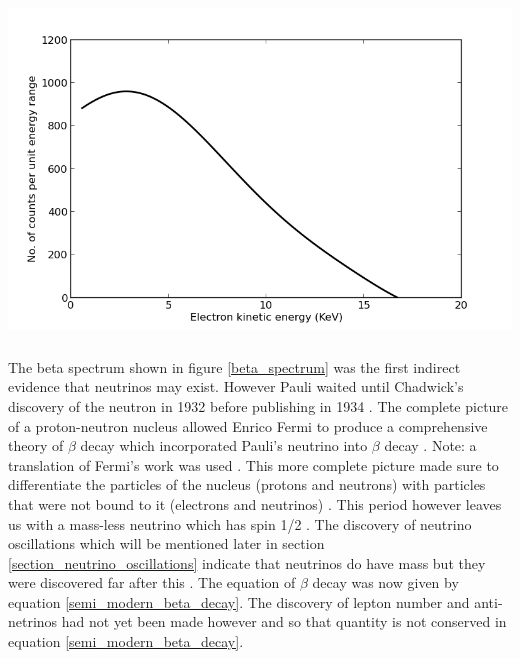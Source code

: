 \documentclass[12pt,a4paper]{article}
\newenvironment{Figure}
  {\par\medskip\noindent\minipage{\linewidth}}
  {\endminipage\par\medskip}
\begin{document}
\begin{Figure}
 \centering
 \includegraphics[height=90mm]{beta_spectrum.png}
 \label{beta_spectrum}
\end{Figure}

The beta spectrum shown in figure \ref{beta_spectrum} was the first indirect evidence that neutrinos may exist. However Pauli waited until Chadwick's discovery of the neutron in 1932 \cite{chadwick1932possible} before publishing in 1934 \cite{lederman1970resource}. The complete picture of a proton-neutron nucleus allowed Enrico Fermi to produce a comprehensive theory of $\beta$ decay which incorporated Pauli's neutrino into $\beta$ decay \cite{lederman1970resource} \cite{Fermi:1934hr}. Note: a translation of Fermi's work was used \cite{wilson1968fermi}. This more complete picture made sure to differentiate the particles of the nucleus (protons and neutrons) with particles that were not bound to it (electrons and neutrinos) \cite{Fermi:1934hr} \cite{wilson1968fermi}. This period however leaves us with a mass-less neutrino which has spin 1/2 \cite{lederman1970resource}. The discovery of neutrino oscillations which will be mentioned later in section \ref{section_neutrino_oscillations} indicate that neutrinos do have mass but they were discovered far after this \cite{griffiths2008introduction}. The equation of $\beta$ decay was now given by equation \ref{semi_modern_beta_decay}. The discovery of lepton number and anti-netrinos had not yet been made however and so that quantity is not conserved in equation \ref{semi_modern_beta_decay}. 
\end{document}
